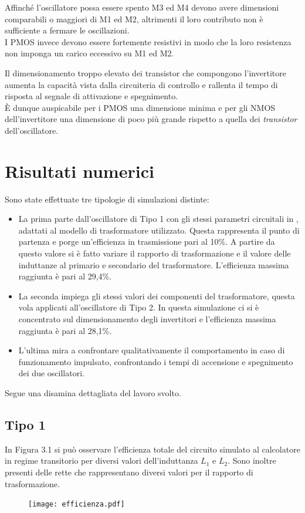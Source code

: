 \documentclass[a4paper, 12pt]{memoir}
\begin{document}
Affinché l'oscillatore possa essere spento M3 ed M4 devono avere dimensioni 
comparabili o maggiori di M1 ed M2, altrimenti il loro contributo non è 
sufficiente a fermare le oscillazioni.\\
I PMOS invece devono essere fortemente resistivi in modo che la loro resistenza
non imponga un carico eccessivo su M1 ed M2.

Il dimensionamento troppo elevato dei transistor che compongono l'invertitore
aumenta la capacità vista dalla circuiteria di controllo e rallenta il tempo di 
risposta al segnale di attivazione e spegnimento.\\
\`E dunque auspicabile per i PMOS una dimensione minima e per gli NMOS 
dell'invertitore una dimensione di poco più grande rispetto a quella dei
\emph{transistor} dell'oscillatore.

\chapter{Risultati numerici}
Sono state effettuate tre tipologie di simulazioni distinte:
\begin{itemize}
\item La prima parte dall'oscillatore di Tipo 1 con gli stessi parametri
	circuitali in \cite{Neviani14}, adattati al modello di trasformatore 
	utilizzato. Questa rappresenta il punto di partenza e porge un'efficienza
	in trasmissione pari al 10\%. A partire da questo valore si è fatto
	variare il rapporto di trasformazione e il valore delle induttanze al
	primario e secondario del trasformatore. L'efficienza massima raggiunta è
	pari al 29,4\%.

\item La seconda impiega gli stessi valori dei componenti del trasformatore,
	questa vola applicati all'oscillatore di Tipo 2. In questa simulazione ci
	si è concentrato sul dimensionamento degli invertitori e l'efficienza
	massima raggiunta è pari al 28,1\%.

\item L'ultima mira a confrontare qualitativamente il comportamento in caso di
	funzionamento impulsato, confrontando i tempi di accensione e spegnimento
	dei due oscillatori.
\end{itemize}
Segue una disamina dettagliata del lavoro svolto.

\section{Tipo 1}
In Figura 3.1 si può osservare l'efficienza totale del circuito simulato al
calcolatore in regime transitorio per diversi valori dell'induttanza $L_1$ e
$L_2$. Sono inoltre presenti delle rette che rappresentano diversi valori per 
il rapporto di trasformazione.
\begin{figure}[h!]
\centering
\texttt{[image: efficienza.pdf]}
\caption{}
\end{figure}
\end{document}
